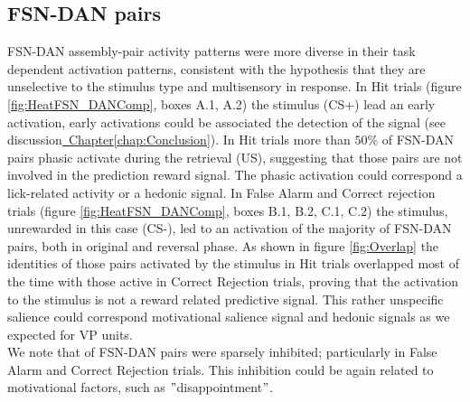 \subsection{FSN-DAN pairs}
FSN-DAN assembly-pair activity patterns were more diverse in their task dependent activation patterns, consistent with the hypothesis that they are unselective to the stimulus type and multisensory in response. In Hit trials (figure \ref{fig:HeatFSN_DANComp}, boxes A.1, A.2) the stimulus (CS+) lead an early activation, early activations could be associated the detection of the signal (see discussion\hyperref[chap:Conclusion]{~Chapter\ref*{chap:Conclusion}}). In Hit trials more than $50\%$ of FSN-DAN pairs phasic activate during the retrieval (US), suggesting that those pairs are not involved in the prediction reward signal. The phasic activation could correspond a lick-related activity or a hedonic signal. In False Alarm and Correct rejection trials (figure \ref{fig:HeatFSN_DANComp}, boxes B.1, B.2, C.1, C.2) the stimulus, unrewarded in this case (CS-), led to an activation of the majority of FSN-DAN pairs, both in original and reversal phase. As shown in figure \ref{fig:Overlap} the identities of those pairs activated by the stimulus in Hit trials overlapped most of the time with those active in Correct Rejection trials, proving that the activation to the stimulus is not a reward related predictive signal. This rather unspecific salience could correspond motivational salience signal and hedonic signals as we expected for VP units.\\We note that of FSN-DAN pairs were sparsely inhibited; particularly in False Alarm and Correct Rejection trials. This inhibition could be again related to motivational factors, such as $"$disappointment$"$. %
